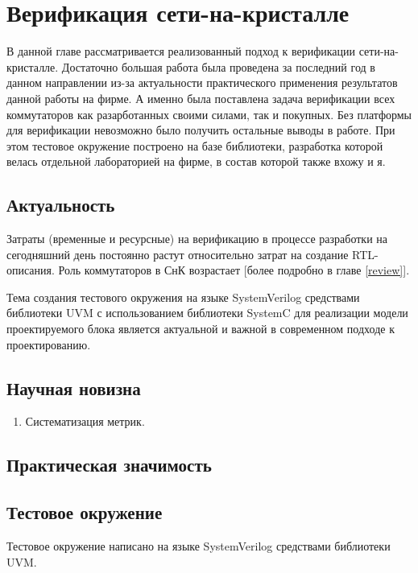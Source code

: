 
\chapter{Верификация сети-на-кристалле}

В данной главе рассматривается реализованный подход к верификации сети-на-кристалле. Достаточно большая работа была проведена за последний год в данном направлении из-за актуальности практического применения результатов данной работы на фирме. А именно была поставлена задача верификации всех коммутаторов как разарботанных своими силами, так и покупных. Без платформы для верификации невозможно было получить остальные выводы в работе. При этом тестовое окружение построено на базе библиотеки, разработка которой велась отдельной лабораторией на фирме, в состав которой также вхожу и я.

\section{Актуальность}

Затраты (временные и ресурсные) на верификацию в процессе разработки на сегодняшний день постоянно растут относительно затрат на создание RTL-описания. Роль коммутаторов в СнК возрастает [более подробно в главе \ref{review}].

Тема создания тестового окружения на языке SystemVerilog средствами библиотеки UVM с использованием библиотеки SystemC для реализации модели проектируемого блока является актуальной и важной в современном подходе к проектированию.

\section{Научная новизна}

\begin{enumerate}
  \item Систематизация метрик.
\end{enumerate}

\section{Практическая значимость}

\section{Тестовое окружение}

Тестовое окружение написано на языке SystemVerilog средствами библиотеки UVM.

